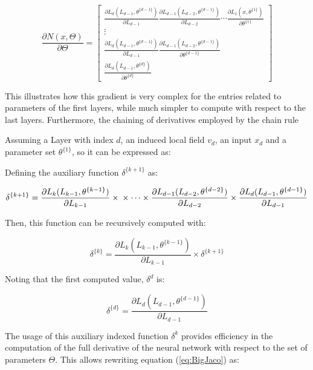 \documentclass[10pt,journal,compsoc]{IEEEtran}
\newcommand{\ce}[1]{equation (\ref{#1})}
\newcommand{\pd}[2]{\frac{\partial #1}{\partial #2}}
\begin{document}
\begin{equation}
	\label{eq:BigJaco}
	\pd{N(x, \Theta)}{\Theta} = \begin{bmatrix}
		\pd{L_d(L_{d-1}, \theta^{\{ d-1 \}})}{ L_{d-1} } \pd{L_{d-1}(L_{d-2}, \theta^{\{ d-1 \}})}{L_{d-2}} \cdots \pd{L_{1}(x, \theta^{\{ 1 \}})}{\theta^{\{ 1 \}}} \\
		\vdots \\
		 \pd{L_d(L_{d-1}, \theta^{\{ d-1 \}})}{ L_{d-1} } \pd{L_{d-1}(L_{d-2}, \theta^{\{ d-1 \}})}{\theta^{\{ d-1 \}}} \\
		 \pd{L_d(L_{d-1}, \theta^{\{ d \}})}{\theta^{\{ d \}}}
		\end{bmatrix}
\end{equation}

This illustrates how this gradient is very complex for the entries related to parameters of the first layers, while much simpler to compute with respect to the last layers. Furthermore, the chaining of derivatives employed by the chain rule 

 Assuming a Layer with index $d$, an induced local field $v_d$, an input $x_d$ and a parameter set $\theta^{\{ 1 \}}$, so it can be expressed as:
 
Defining the auxiliary function $\delta^{\{ k+1 \}}$ as:


\begin{dmath}
	\delta^{\{ k+1 \}} = \pd{L_k(L_{k-1}, \theta^{\{ k-1 \}})}{ L_{k-1} } \times \\
	\times \cdots \times \\ 
	\pd{L_{d-1}(L_{d-2}, \theta^{\{ d-2 \}})}{ L_{d-2} } \times \\
	\pd{L_d(L_{d-1}, \theta^{\{ d-1 \}})}{ L_{d-1} }
\end{dmath}

Then, this function can be recursively computed with:

\begin{dmath}
	\delta^{\{ k \}} = \pd{L_k(L_{k-1}, \theta^{\{ k-1 \}})}{ L_{k-1} } \times \delta^{\{ k+1 \}} 
\end{dmath}

Noting that the first computed value, $\delta^{d}$ is:

\begin{equation}
	\delta^{\{ d \}} = \pd{L_d(L_{d-1}, \theta^{\{ d-1 \}})}{ L_{d-1} }
\end{equation}

The usage of this auxiliary indexed function $\delta^{k}$ provides efficiency in the computation of the full derivative of the neural network with respect to the set of parameters $\Theta$. This allows rewriting \ce{eq:BigJaco} as:
\end{document}
